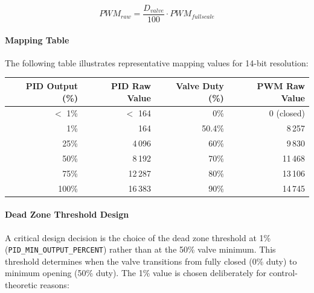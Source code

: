 \documentclass[12pt,a4paper]{article}
\begin{document}
\begin{equation}
PWM_{raw} = \frac{D_{valve}}{100} \cdot PWM_{fullscale}
\end{equation}

\paragraph{Mapping Table}
The following table illustrates representative mapping values for 14-bit resolution:

\begin{center}
\begin{tabular}{r r r r}
\hline
\textbf{PID Output (\%)} & \textbf{PID Raw Value} & \textbf{Valve Duty (\%)} & \textbf{PWM Raw Value} \\
\hline
$<$ 1\% & $<$ 164 & 0\% & 0 (closed) \\
1\% & 164 & 50.4\% & 8\,257 \\
25\% & 4\,096 & 60\% & 9\,830 \\
50\% & 8\,192 & 70\% & 11\,468 \\
75\% & 12\,287 & 80\% & 13\,106 \\
100\% & 16\,383 & 90\% & 14\,745 \\
\hline
\end{tabular}
\end{center}

\paragraph{Dead Zone Threshold Design}
A critical design decision is the choice of the dead zone threshold at 1\% (\texttt{PID\_MIN\_OUTPUT\_PERCENT}) rather than at the 50\% valve minimum. This threshold determines when the valve transitions from fully closed (0\% duty) to minimum opening (50\% duty). The 1\% value is chosen deliberately for control-theoretic reasons:
\end{document}
